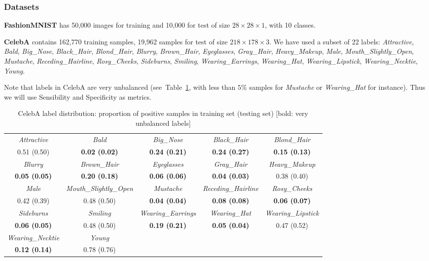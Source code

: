 \subsubsection{Datasets}

\textbf{FashionMNIST} has 50,000 images for training and 10,000 for test of size $28 \times 28 \times 1$, with 10 classes.

\textbf{CelebA} contains 162,770 training samples, 19,962 samples for test of size $218\times 178 \times 3$. We have used  a subset of 22 labels: \textit{Attractive}, \textit{Bald}, \textit{Big\_Nose},
\textit{Black\_Hair}, \textit{Blond\_Hair}, \textit{Blurry}, \textit{Brown\_Hair}, \textit{Eyeglasses}, \textit{Gray\_Hair}, \textit{Heavy\_Makeup}, \textit{Male}, \textit{Mouth\_Slightly\_Open}, \textit{Mustache}, \textit{Receding\_Hairline}, \textit{Rosy\_Cheeks}, \textit{Sideburns}, \textit{Smiling}, \textit{Wearing\_Earrings}, \textit{Wearing\_Hat}, \textit{Wearing\_Lipstick}, \textit{Wearing\_Necktie}, \textit{Young}.

Note that labels in CelebA are very unbalanced (see~Table~\ref{tab:celebA_stats}, with less than $5\%$ samples for \textit{Mustache} or \textit{Wearing\_Hat} for instance). Thus we will use Sensibility and Specificity as metrics.
\begin{table}[h]
  \caption{CelebA label distribution: proportion of positive samples in training set (testing set) [bold: very unbalanced labels]}
  \label{tab:celebA_stats}
  \centering
  \begin{tabular}{c@{}c@{}c@{}c@{}c}
    \toprule
    \textit{Attractive}& \textit{Bald}& \textit{Big\_Nose}&
\textit{Black\_Hair}& \textit{Blond\_Hair}\\
  0.51 (0.50) & \textbf{0.02 (0.02)} & \textbf{0.24 (0.21)} & \textbf{0.24 (0.27)} & \textbf{0.15 (0.13)}  \\
  \textit{Blurry}  & \textit{Brown\_Hair}& \textit{Eyeglasses}& \textit{Gray\_Hair}& \textit{Heavy\_Makeup} \\
 \textbf{0.05 (0.05)} & \textbf{0.20 (0.18)} & \textbf{0.06 (0.06)} & \textbf{0.04 (0.03)} & 0.38 (0.40)  \\
    \textit{Male} & \textit{Mouth\_Slightly\_Open}& \textit{Mustache}& \textit{Receding\_Hairline}& \textit{Rosy\_Cheeks}\\
 0.42 (0.39) & 0.48 (0.50) & \textbf{0.04 (0.04)} & \textbf{0.08 (0.08)} & \textbf{0.06 (0.07)}  \\
    \textit{Sideburns}& \textit{Smiling} & \textit{Wearing\_Earrings}& \textit{Wearing\_Hat}& \textit{Wearing\_Lipstick}\\
    \textbf{0.06 (0.05)} & 0.48 (0.50) & \textbf{0.19 (0.21)} & \textbf{0.05 (0.04)} & 0.47 (0.52)  \\
    \textit{Wearing\_Necktie}& \textit{Young} \\
    \textbf{0.12 (0.14)} &  0.78 (0.76)\\
    \midrule
  \end{tabular}
\end{table}

